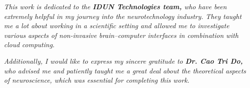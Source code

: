 \begin{dedication}

  \textit{This work is dedicated to the \textbf{IDUN Technologies team,} who have been extremely helpful in my journey into the neurotechnology industry. They taught me a lot about working in a scientific setting and allowed me to investigate various aspects of non-invasive brain–\break computer interfaces in combination with cloud computing.}

  \hfill \break

  \textit{Additionally, I would like to express my sincere gratitude to \textbf{Dr. Cao Tri Do,} who advised me and patiently taught me a great deal about the theoretical aspects of neuroscience, \break which was essential for completing this work.}

\end{dedication}
